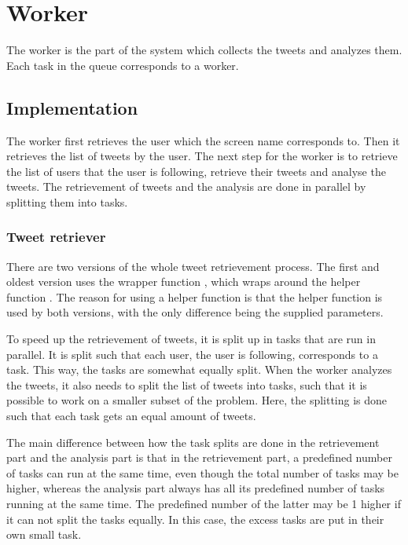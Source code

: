 \chapter{Worker}\label{workerLabel}
The worker is the part of the system which collects the tweets and analyzes
them. Each task in the queue corresponds to a worker. 

\section{Implementation}
The worker first retrieves the user which the screen name corresponds to. Then
it retrieves the list of tweets by the user. The next step for the
worker is to retrieve the list of users that the user is following, retrieve
their tweets and analyse the tweets. The retrievement of tweets and the
analysis are done in parallel by splitting them into tasks.

\subsection{Tweet retriever}
There are two versions of the whole tweet retrievement process. The first and
oldest version uses the wrapper function , which wraps
around the helper function . The reason for using
a helper function is that the helper function is used by both versions, with the
only difference being the supplied parameters.


To speed up the retrievement of tweets, it is split up in tasks that are run in
parallel. It is split such that each user, the user is following, corresponds
to a task. This way, the tasks are somewhat equally split. 
When the worker analyzes the tweets, it also needs to split the list of tweets
into tasks, such that it is possible to work on a smaller subset of the
problem. Here, the splitting is done such that each task gets an equal amount of
tweets.

The main difference between how the task splits are done in the retrievement
part and the analysis part is that in the retrievement part, a predefined number
of tasks can run at the same time, even though the total number of tasks may be
higher, whereas the analysis part always has all its predefined number of tasks
running at the same time. The predefined number of the latter may be 1 higher if
it can not split the tasks equally. In this case, the excess tasks are
put in their own small task.

\subsection{}
